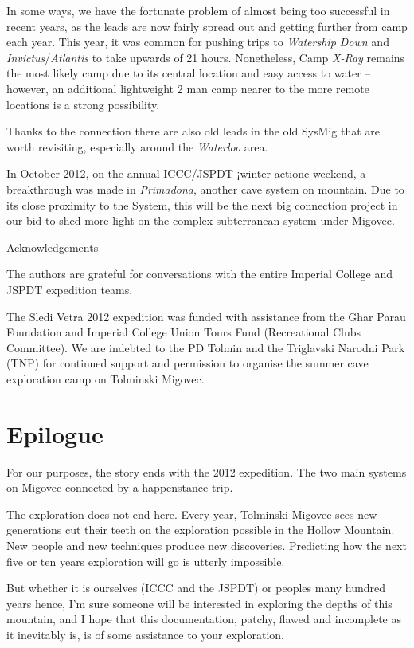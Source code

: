 In some ways, we have the fortunate problem of almost being too
successful in recent years, as the leads are now fairly spread out and
getting further from camp each year. This year, it was common for
pushing trips to \emph{Watership Down} and
\emph{Invictus}/\emph{Atlantis} to take upwards of 21 hours.
Nonetheless, Camp \emph{X-Ray} remains the most likely camp due to its
central location and easy access to water -- however, an additional
lightweight 2 man camp nearer to the more remote locations is a strong
possibility.

Thanks to the connection there are also old leads in the old SysMig that
are worth revisiting, especially around the \emph{Waterloo} area.

In October 2012, on the annual ICCC/JSPDT ¡winter action¢ weekend, a
breakthrough was made in \emph{Primadona}, another cave system on
mountain. Due to its close proximity to the System, this will be the
next big connection project in our bid to shed more light on the complex
subterranean system under Migovec.

Acknowledgements

The authors are grateful for conversations with the entire Imperial
College and JSPDT expedition teams.

The Sledi Vetra 2012 expedition was funded with assistance from the Ghar
Parau Foundation and Imperial College Union Tours Fund (Recreational
Clubs Committee). We are indebted to the PD Tolmin and the Triglavski
Narodni Park (TNP) for continued support and permission to organise the
summer cave exploration camp on Tolminski Migovec.

\hypertarget{epilogue}{%
\chapter{Epilogue}\label{epilogue}}

For our purposes, the story ends with the 2012 expedition. The two main
systems on Migovec connected by a happenstance trip.

The exploration does not end here. Every year, Tolminski Migovec sees
new generations cut their teeth on the exploration possible in the
Hollow Mountain. New people and new techniques produce new discoveries.
Predicting how the next five or ten years exploration will go is utterly
impossible.

But whether it is ourselves (ICCC and the JSPDT) or peoples many hundred
years hence, I'm sure someone will be interested in exploring the depths
of this mountain, and I hope that this documentation, patchy, flawed and
incomplete as it inevitably is, is of some assistance to your
exploration.

